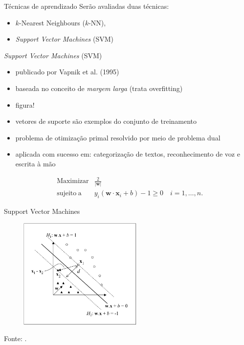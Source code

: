\documentclass{beamer}
\newcommand{\vect}[1]{\mathbf{#1}}
\newcommand{\norma}[1]{| #1 |}
\begin{document}
\begin{frame}{Técnicas de aprendizado}
Serão avaliadas duas técnicas:
\begin{itemize}
\item $k$-Nearest Neighbours ($k$-NN),
\item \emph{Support Vector Machines} (SVM)
\end{itemize}
\end{frame}

\begin{frame}{\emph{Support Vector Machines} (SVM)}
\begin{itemize}
  \item publicado por Vapnik et al. (1995)\nocite{vapnik1998statistical}
  \item baseada no conceito de \emph{margem larga} (trata overfitting)
  \item figura!
  \item vetores de suporte são exemplos do conjunto de treinamento
  \item problema de otimiza\c{c}ão primal resolvido por meio de problema
dual
  \item aplicada com sucesso em: categorização de textos, reconhecimento de
voz e escrita à mão\cite{bennett2000support}
\end{itemize}

\begin{eqnarray}
& \label{eq:max_w0}\operatorname{Maximizar} & \frac{2}{\norma{\vect{w}}} \\
& \label{eq:max_w1} \operatorname{sujeito\;a} & y_i(\vect{w}\cdot\vect{x}_i + b) - 1 \ge 0 \quad i = 1,\dotsc,n.
\end{eqnarray}

\end{frame}

\begin{frame}{Support Vector Machines}
\begin{figure}
\centering
\includegraphics[height=5.5cm]{img/fig-hiperplanos.png}
\end{figure}
\tiny{Fonte: \cite{lorena2003introducaoas}.}
\end{frame}
\end{document}
